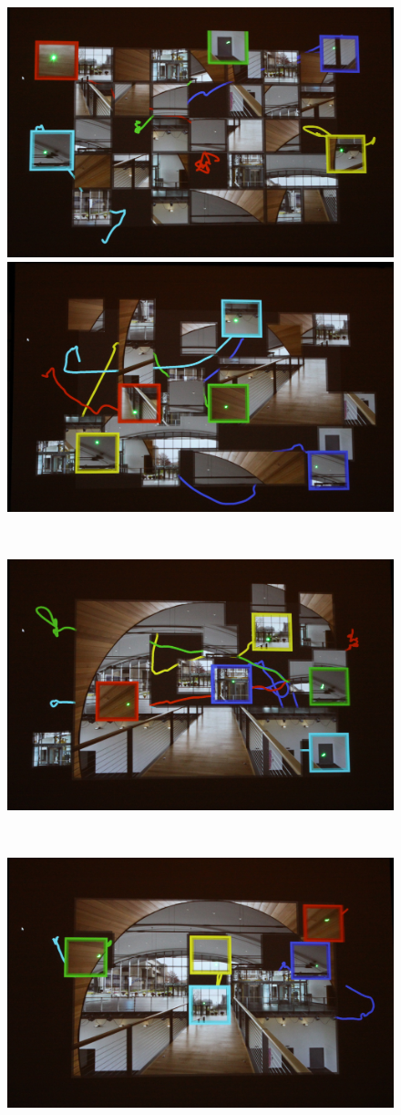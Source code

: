 \documentclass[review]{vgtc}                 %
\begin{document}
\begin{figure}[t]
  \begin{center}
  \begin{minipage}{0.99\linewidth}
    \includegraphics[width=0.49\linewidth]{images/puzzle1.jpg}
    \includegraphics[width=0.49\linewidth]{images/puzzle2.jpg}
  \end{minipage}  \\
  \begin{minipage}{0.99\linewidth}
    \includegraphics[width=0.99\linewidth]{images/puzzle3.jpg}     
  \end{minipage}  \\
  \begin{minipage}{0.99\linewidth}
    \includegraphics[width=0.49\linewidth]{images/puzzle4.jpg}

\end{minipage}
\end{center}
\end{figure}
\end{document}
